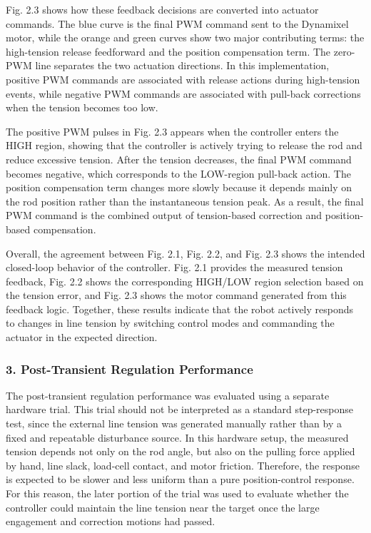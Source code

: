 \documentclass[conference]{IEEEtran}
\begin{document}
Fig. 2.3 shows how these feedback decisions are converted into actuator commands. The blue curve is the final PWM command sent to the Dynamixel motor, while the orange and green curves show two major contributing terms: the high-tension release feedforward and the position compensation term. The zero-PWM line separates the two actuation directions. In this implementation, positive PWM commands are associated with release actions during high-tension events, while negative PWM commands are associated with pull-back corrections when the tension becomes too low.

The positive PWM pulses in Fig. 2.3 appears when the controller enters the HIGH region, showing that the controller is actively trying to release the rod and reduce excessive tension. After the tension decreases, the final PWM command becomes negative, which corresponds to the LOW-region pull-back action. The position compensation term changes more slowly because it depends mainly on the rod position rather than the instantaneous tension peak. As a result, the final PWM command is the combined output of tension-based correction and position-based compensation.

Overall, the agreement between Fig. 2.1, Fig. 2.2, and Fig. 2.3 shows the intended closed-loop behavior of the controller. Fig. 2.1 provides the measured tension feedback, Fig. 2.2 shows the corresponding HIGH/LOW region selection based on the tension error, and Fig. 2.3 shows the motor command generated from this feedback logic. Together, these results indicate that the robot actively responds to changes in line tension by switching control modes and commanding the actuator in the expected direction.

\subsubsection{3. Post-Transient Regulation Performance}
The post-transient regulation performance was evaluated using a separate hardware trial. This trial should not be interpreted as a standard step-response test, since the external line tension was generated manually rather than by a fixed and repeatable disturbance source. In this hardware setup, the measured tension depends not only on the rod angle, but also on the pulling force applied by hand, line slack, load-cell contact, and motor friction. Therefore, the response is expected to be slower and less uniform than a pure position-control response. For this reason, the later portion of the trial was used to evaluate whether the controller could maintain the line tension near the target once the large engagement and correction motions had passed.
\end{document}

